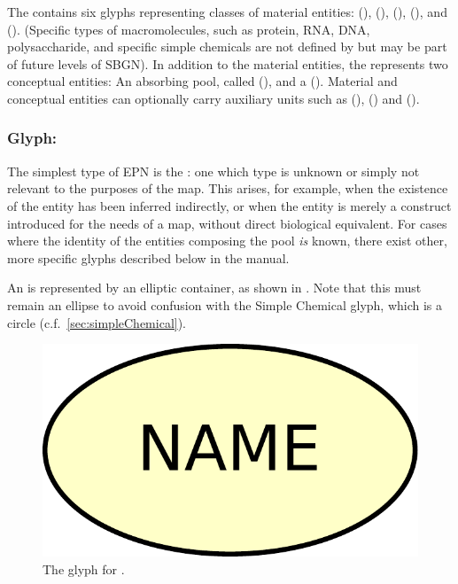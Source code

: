 The \PDl contains six glyphs representing classes of material entities:  (),  (),  (),  (), and  ().  (Specific types of macromolecules, such as protein, RNA, DNA, polysaccharide, and specific simple chemicals are not defined by \PD but may be part of future levels of SBGN). In addition to the material entities, the \PDl represents two conceptual entities: An absorbing pool, called  (), and a  ().  Material and conceptual entities can optionally carry auxiliary units such as  (),   () and  ().

\subsubsection{Glyph: }
\label{sec:unspecifiedEntity}

The simplest type of EPN is the : one which type is unknown or simply not relevant to the purposes of the map. This arises, for example, when the existence of the entity has been inferred indirectly, or when the entity is merely a construct introduced for the needs of a map, without direct biological equivalent.  For cases where the identity of the entities composing the pool \emph{is} known, there exist other, more specific glyphs described below in the manual.

An  is represented by an elliptic container, as shown in .  Note that this
must remain an ellipse to avoid confusion with the Simple Chemical glyph, which is a circle (c.f.\, \ref{sec:simpleChemical}).

\begin{figure}[htb]
  \centering
  \includegraphics[scale = 0.3]{le_images/unspecified}
  \caption{The \PD glyph for .}
  \label{fig:unspecified}
\end{figure}

